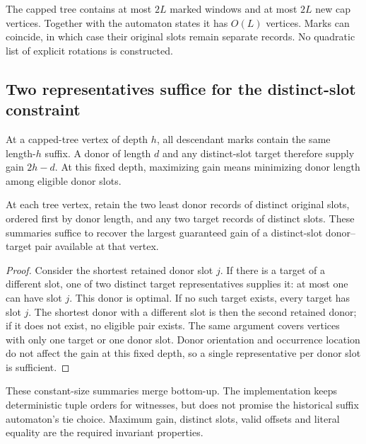 The capped tree contains at most $2L$ marked windows and at most $2L$ new
cap vertices.  Together with the automaton states it has $O(L)$ vertices.
Marks can coincide, in which case their original slots remain separate
records.  No quadratic list of explicit rotations is constructed.

\subsection{Two representatives suffice for the distinct-slot constraint}

At a capped-tree vertex of depth $h$, all descendant marks contain the same
length-$h$ suffix.  A donor of length $d$ and any distinct-slot target
therefore supply gain $2h-d$.  At this fixed depth, maximizing gain means
minimizing donor length among eligible donor slots.

\begin{lemma}
At each tree vertex, retain the two least donor records of distinct
original slots, ordered first by donor length, and any two target records
of distinct slots.  These summaries suffice to recover the largest
guaranteed gain of a distinct-slot donor--target pair available at that
vertex.
\end{lemma}
\begin{proof}
Consider the shortest retained donor slot $j$.  If there is a target of a
different slot, one of two distinct target representatives supplies it:
at most one can have slot $j$.  This donor is optimal.  If no such target
exists, every target has slot $j$.  The shortest donor with a different
slot is then the second retained donor; if it does not exist, no eligible
pair exists.  The same argument covers vertices with only one target or
one donor slot.  Donor orientation and occurrence location do not affect
the gain at this fixed depth, so a single representative per donor slot
is sufficient.
\end{proof}

These constant-size summaries merge bottom-up.  The implementation keeps
deterministic tuple orders for witnesses, but does not promise the
historical suffix automaton's tie choice.  Maximum gain, distinct slots,
valid offsets and literal equality are the required invariant properties.

